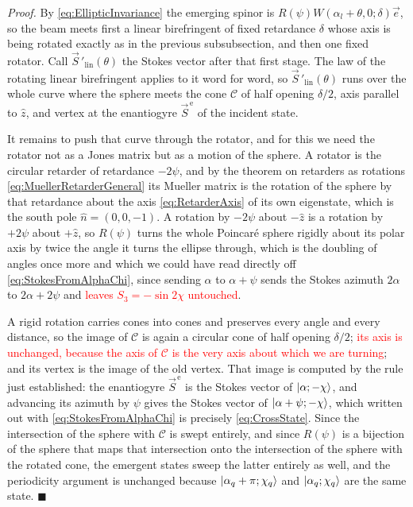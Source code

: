             \textit{Proof.} By \ref{eq:EllipticInvariance} the emerging spinor is $R(\psi)W\left(\alpha_l+\theta,0;\delta\right)\vec{e}$, so the beam meets first a linear birefringent of fixed retardance $\delta$ whose axis is being rotated exactly as in the previous subsubsection, and then one fixed rotator. Call $\vec{S}\,'_{\text{lin}}(\theta)$ the Stokes vector after that first stage. The law of the rotating linear birefringent applies to it word for word, so $\vec{S}\,'_{\text{lin}}(\theta)$ runs over the whole curve where the sphere meets the cone $\mathcal{C}$ of half opening $\delta/2$, axis parallel to $\hat{z}$, and vertex at the enantiogyre $\vec{S}^{\,\text{e}}$ of the incident state.

            It remains to push that curve through the rotator, and for this we need the rotator not as a Jones matrix but as a motion of the sphere. A rotator is the circular retarder of retardance $-2\psi$, and by the theorem on retarders as rotations \ref{eq:MuellerRetarderGeneral} its Mueller matrix is the rotation of the sphere by that retardance about the axis \ref{eq:RetarderAxis} of its own eigenstate, which is the south pole $\hat n=\left(0,0,-1\right)$. A rotation by $-2\psi$ about $-\hat{z}$ is a rotation by $+2\psi$ about $+\hat{z}$, so $R(\psi)$ turns the whole Poincaré sphere rigidly about its polar axis by twice the angle it turns the ellipse through, which is the doubling of angles once more and which we could have read directly off \ref{eq:StokesFromAlphaChi}, since sending $\alpha$ to $\alpha+\psi$ sends the Stokes azimuth $2\alpha$ to $2\alpha+2\psi$ and \textcolor{red}{leaves $S_3=-\sin2\chi$ untouched}.

            A rigid rotation carries cones into cones and preserves every angle and every distance, so the image of $\mathcal{C}$ is again a circular cone of half opening $\delta/2$; \textcolor{red}{its axis is unchanged, because the axis of $\mathcal{C}$ is the very axis about which we are turning}; and its vertex is the image of the old vertex. That image is computed by the rule just established: the enantiogyre $\vec S^{\,\text{e}}$ is the Stokes vector of $\ket{\alpha;-\chi}$, and advancing its azimuth by $\psi$ gives the Stokes vector of $\ket{\alpha+\psi;-\chi}$, which written out with \ref{eq:StokesFromAlphaChi} is precisely \ref{eq:CrossState}. Since the intersection of the sphere with $\mathcal{C}$ is swept entirely, and since $R(\psi)$ is a bijection of the sphere that maps that intersection onto the intersection of the sphere with the rotated cone, the emergent states sweep the latter entirely as well, and the periodicity argument is unchanged because $\ket{\alpha_q+\pi;\chi_q}$ and $\ket{\alpha_q;\chi_q}$ are the same state. $\blacksquare$

